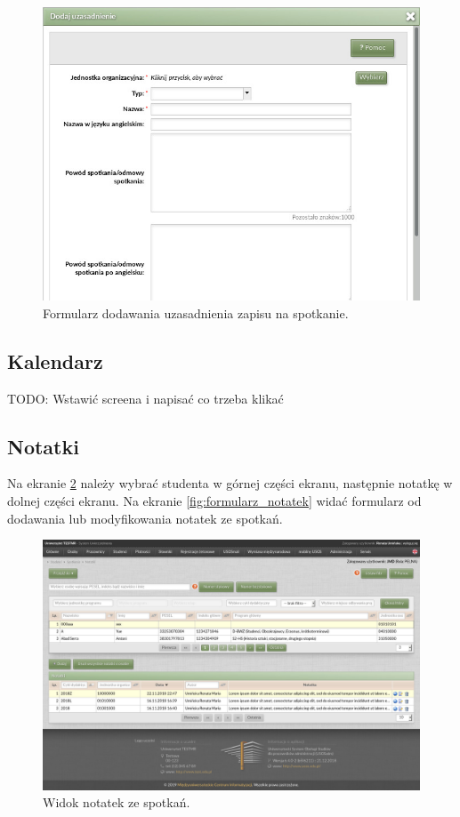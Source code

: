 \documentclass[licencjacka]{pracamgr}
\begin{document}
\begin{figure}[!]
  \includegraphics[width=\linewidth]{formularz_uzasadnien.jpg}
  \caption{Formularz dodawania uzasadnienia zapisu na spotkanie.}
  \label{fig:formularz_uzasadnienia}
\end{figure}

\subsection{Kalendarz}
TODO: Wstawić screena i napisać co trzeba klikać

\subsection{Notatki}
Na ekranie \ref{fig:notatki} należy wybrać studenta w górnej części ekranu, następnie notatkę w dolnej części ekranu.
Na ekranie \ref{fig:formularz_notatek} widać formularz od dodawania lub modyfikowania notatek ze spotkań.

\begin{figure}[!]
  \includegraphics[width=\linewidth]{widok_notatek.jpg}
  \caption{Widok notatek ze spotkań.}
  \label{fig:notatki}
\end{figure}
\end{document}
